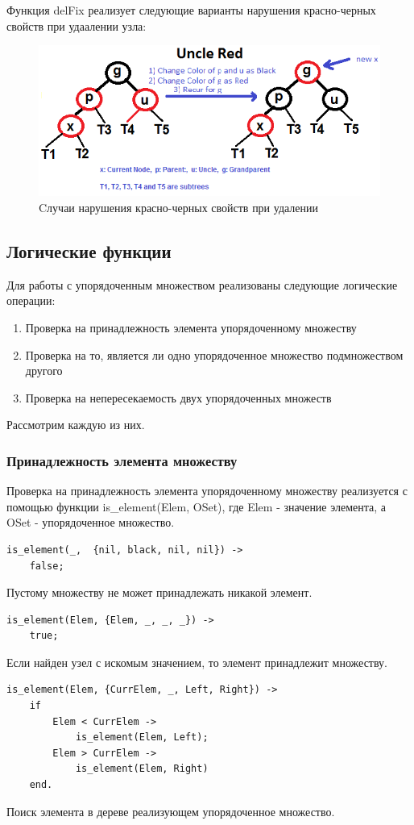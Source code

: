 			Функция delFix реализует следующие варианты нарушения красно-черных свойств 
			при удаалении узла:
			\begin{figure}[H]
				\centering
				\includegraphics[width=\textwidth]{img/tan-aus.png}
				\caption{Cлучаи нарушения красно-черных свойств при удалении}
			\end{figure}
			
			
	\subsection{Логические функции}
		Для работы с упорядоченным множеством реализованы следующие логические операции:
		\begin{enumerate}
			\item Проверка на принадлежность элемента упорядоченному множеству
			\item Проверка на то, является ли одно упорядоченное множество
				  подмножеством другого
			\item Проверка на непересекаемость двух упорядоченных множеств
		\end{enumerate} 
		Рассмотрим каждую из них.
		
		\subsubsection{Принадлежность элемента множеству}
			Проверка на принадлежность элемента упорядоченному множеству
			реализуется с помощью функции is\_element(Elem, OSet), где Elem - 
			значение элемента, а OSet - упорядоченное множество.
			\begin{lstlisting}
is_element(_,  {nil, black, nil, nil}) ->
    false;				
			\end{lstlisting}
			Пустому множеству не может принадлежать никакой элемент.
			\begin{lstlisting}
is_element(Elem, {Elem, _, _, _}) ->
    true;
			\end{lstlisting}
			Если найден узел с искомым значением, то элемент принадлежит множеству.
			\begin{lstlisting}
is_element(Elem, {CurrElem, _, Left, Right}) ->		
    if
        Elem < CurrElem -> 
            is_element(Elem, Left);
        Elem > CurrElem -> 
            is_element(Elem, Right)
    end.	
			\end{lstlisting}
			Поиск элемента в дереве реализующем упорядоченное множество.
			
